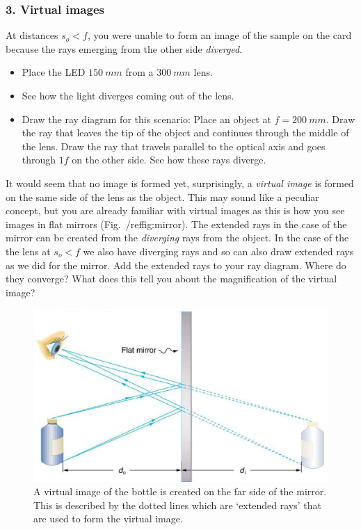 \documentclass[a4paper]{report}
\begin{document}
\subsubsection{3. Virtual images}
At distances $s_o<f$, you were unable to form an image of the sample on the card because the rays emerging from the other side \textit{diverged}.
\begin{itemize}
\item Place the LED $150~mm$ from a $300~mm$ lens. 
\item See how the light diverges coming out of the lens. 
\item Draw the ray diagram for this scenario: Place an object at $f=200~mm$.
Draw the ray that leaves the tip of the object and continues through the middle of the lens. 
Draw the ray that travels parallel to the optical axis and goes through $1f$ on the other side.
See how these rays diverge. 
\end{itemize}

It would seem that no image is formed yet, surprisingly, a \textit{virtual image} is formed on the same side of the lens as the object. 
This may sound like a peculiar concept, but you are already familiar with virtual images as this is how you see images in flat  mirrors (Fig.~/ref{fig:mirror}). 
The extended rays in the case of the mirror can be created from the \textit{diverging} rays from the object. 
In the case of the the lens at $s_o<f$ we also have diverging rays and so can also draw extended rays as we did for the mirror. 
Add the extended rays to your ray diagram. Where do they converge? What does this tell you about the magnification of the virtual image?
\begin{figure}[h]
\center
\includegraphics{virtual_image_mirr.eps}
\caption{A virtual image of the bottle is created on the far side of the mirror. 
This is described by the dotted lines which are `extended rays' that are used to form the virtual image. }
\label{fig:mirror}
\end{figure}
\end{document}
